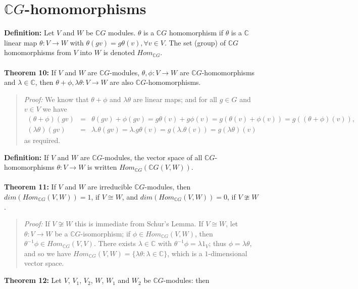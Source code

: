 \section {${\mathbb C}G$-homomorphisms}
{\bf Definition:}
Let $V$ and $W$ be ${\mathbb C}G$ modules.  $\theta$ is a ${\mathbb C}G$ homomorphism if $\theta$ is a ${\mathbb C}$ linear map $\theta: V \rightarrow W$
with $\theta(gv) = g \theta(v), \forall v \in V$.  The set (group) of ${\mathbb C}G$ homomorphisms 
from $V$ into $W$ is denoted $Hom_{{\mathbb C}G}$.
\\
\\
{\bf Theorem 10:} If $V$ and $W$ are ${\mathbb C}G$-modules,
$\theta,\phi: V \rightarrow W$ are ${\mathbb C}G$-homomorphisms and $\lambda \in {\mathbb C}$, then
$\theta+\phi,\lambda\theta: V \rightarrow W$ are also ${\mathbb C}G$-homomorphisms.
\begin{quote}
\emph{Proof:}
We know that $\theta+\phi$ and $\lambda\theta$ are linear maps; and for
all $g\in G$ and $v\in V$ we have
\begin{eqnarray*}
(\theta+\phi)(gv)\!\!\!\!&=&\!\!\!\!\theta(gv)+\phi(gv)=g\theta(v)+g\phi(v)
=g(\theta(v)+\phi(v))=g((\theta+\phi)(v)),\\
(\lambda\theta)(gv)\!\!\!\!&=&\!\!\!\!\lambda.\theta(gv)
=\lambda.g\theta(v)=g(\lambda.\theta(v))=g(\lambda\theta)(v)
\end{eqnarray*}
as required.
\end{quote}
{\bf Definition:} If $V$ and $W$ are ${\mathbb C}G$-modules, the vector space
of all ${\mathbb C}G$-homomorphisms $\theta:V\rightarrow W$ is written
$Hom_{{\mathbb C}G}({\mathbb C}G(V,W))$.
\\
\\
{\bf Theorem 11:} If $V$ and $W$ are irreducible
${\mathbb C}G$-modules, then
$dim(Hom_{{\mathbb C}G}(V,W)) = 1$, if $V \cong W$, and
$dim(Hom_{{\mathbb C}G}(V,W)) = 0$, if $V \ncong W$.
\begin{quote}
\emph{Proof:}
If $V \not \cong W$ this is immediate from Schur's Lemma. If $V \cong W$,
let $\theta: V \rightarrow W$ be a ${\mathbb C}G$-isomorphism; if $\phi\in Hom_{{\mathbb C}G}(V,W)$,
then $\theta^{-1}\phi\in Hom_{{\mathbb C}G}(V,V)$. There exists
$\lambda \in {\mathbb C}$ with $\theta^{-1}\phi=\lambda1_V$; thus $\phi=\lambda\theta$,
and so we have $Hom_{{\mathbb C}G}(V,W)=\{\lambda\theta: \lambda \in {\mathbb C}\}$,
which is a $1$-dimensional vector space.
\end{quote}
{\bf Theorem 12:} Let $V$, $V_1$, $V_2$, $W$, $W_1$ and
$W_2$ be ${\mathbb C}G$-modules: then
